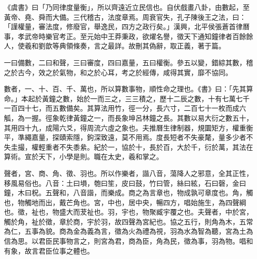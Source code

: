 
\begin{pinyinscope}
《虞書》曰「乃同律度量衡」，所以齊遠近立民信也。自伏戲畫八卦，由數起，至黃帝、堯、舜而大備。三代稽古，法度章焉。周衰官失，孔子陳後王之法，曰：「謹權量，審法度，修廢官，舉逸民，四方之政行矣。」漢興，北平侯張蒼首律曆事，孝武帝時樂官考正。至元始中王莽秉政，欲燿名譽，徵天下通知鐘律者百餘餘人，使羲和劉歆等典領條奏，言之最詳。故刪其偽辭，取正義，著于篇。

一曰備數，二曰和聲，三曰審度，四曰嘉量，五曰權衡。參五以變，錯綜其數，稽之於古今，效之於氣物，和之於心耳，考之於經傳，咸得其實，靡不協同。

數者，一、十、百、千、萬也，所以算數事物，順性命之理也。《書》曰：「先其算命。」本起於黃鐘之數，始於一而三之，三三積之，歷十二辰之數，十有七萬七千一百四十七，而五數備矣。其算法用竹，徑一分，長六寸，二百七十一枚而成六觚，為一握。徑象乾律黃鐘之一，而長象坤呂林鐘之長。其數以易大衍之數五十，其用四十九，成陽六爻，得周流六虛之象也。夫推曆生律制器，規圜矩方，權重衡平，準繩嘉量，探賾索隱，鉤深致遠，莫不用焉。度長短者不失豪氂，量多少者不失圭撮，權輕重者不失黍絫。紀於一，協於十，長於百，大於千，衍於萬，其法在算術。宣於天下，小學是則。職在太史，羲和掌之。

聲者，宮、商、角、徵、羽也。所以作樂者，諧八音，蕩降人之邪意，全其正性，移風易俗也。八音：土曰塤，匏曰笙，皮曰鼓，竹曰管，絲曰絃，石曰磬，金曰鐘，木曰柷。五聲和，八音諧，而樂成。商之為言章也，物成孰可章度也。角，觸也，物觸地而出，戴芒角也。宮，中也，居中央，暢四方，唱始施生，為四聲綱也。徵，祉也，物盛大而茇祉也。羽，宇也，物聚臧宇覆之也。夫聲者，中於宮，觸於角，祉於徵，章於商，宇於羽，故四聲為宮紀也。協之五行，則角為木，五常為仁，五事為貌。商為金為義為言，徵為火為禮為視，羽為水為智為聽，宮為土為信為思。以君臣民事物言之，則宮為君，商為臣，角為民，徵為事，羽為物。唱和有象，故言君臣位事之體也。


\end{pinyinscope}
